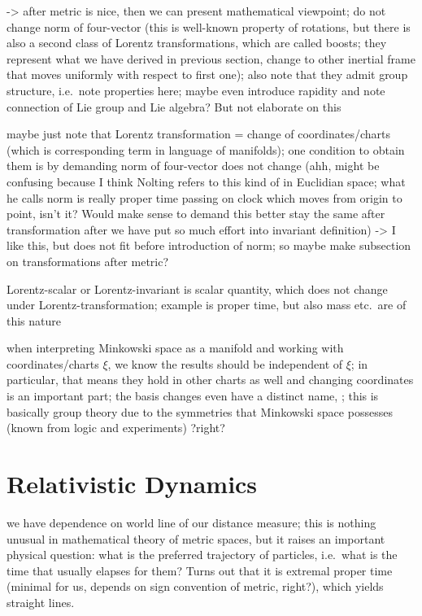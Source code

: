 -> after metric is nice, then we can present mathematical viewpoint; do not change norm of four-vector (this is well-known property of rotations, but there is also a second class of Lorentz transformations, which are called boosts; they represent what we have derived in previous section, change to other inertial frame that moves uniformly with respect to first one); also note that they admit group structure, i.e.~note properties here; maybe even introduce rapidity and note connection of Lie group and Lie algebra? But not elaborate on this

maybe just note that Lorentz transformation = change of coordinates/charts (which is corresponding term in language of manifolds); one condition to obtain them is by demanding norm of four-vector does not change (ahh, might be confusing because I think Nolting refers to this kind of in Euclidian space; what he calls norm is really proper time passing on clock which moves from origin to point, isn't it? Would make sense to demand this better stay the same after transformation after we have put so much effort into invariant definition) -> I like this, but does not fit before introduction of norm; so maybe make subsection on transformations after metric?



Lorentz-scalar or Lorentz-invariant is scalar quantity, which does not change under Lorentz-transformation; example is proper time, but also mass etc.~are of this nature





when interpreting Minkowski space as a manifold and working with coordinates/charts $\xi$, we know the results should be independent of $\xi$; in particular, that means they hold in other charts as well and changing coordinates is an important part; the basis changes even have a distinct name, ; this is basically group theory due to the symmetries that Minkowski space possesses (known from logic and experiments) ?right?




\newpage



	\section{Relativistic Dynamics}
we have dependence on world line of our distance measure; this is nothing unusual in mathematical theory of metric spaces, but it raises an important physical question: what is the preferred trajectory of particles, i.e.~what is the time that usually elapses for them? Turns out that it is extremal proper time (minimal for us, depends on sign convention of metric, right?), which yields straight lines.



